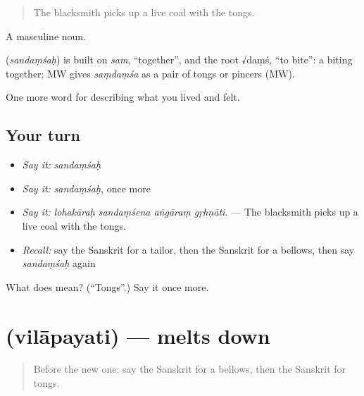 \begin{quote}
The blacksmith picks up a live coal with the tongs.
\end{quote}

A masculine noun.

\begin{cousinweb}
\textbf{} (\emph{sandaṃśaḥ}) is built on \emph{sam}, \textquotedblleft{}together\textquotedblright{}, and the root √daṃś, \textquotedblleft{}to bite\textquotedblright{}: a biting together; MW gives \emph{saṃdaṃśa} as a pair of tongs or pincers (MW).
\end{cousinweb}

\begin{grammarlens}[title={What you've built}]
One more word for describing what you lived and felt.
\end{grammarlens}

\subsection*{Your turn}
\begin{itemize}
\raggedright
  \item \emph{Say it:} \emph{sandaṃśaḥ}
  \item \emph{Say it:} \emph{sandaṃśaḥ}, once more
  \item \emph{Say it:} \emph{lohakāraḥ sandaṃśena aṅgāraṃ gṛhṇāti.} — The blacksmith picks up a live coal with the tongs.
  \item \emph{Recall:} say the Sanskrit for a tailor, then the Sanskrit for a bellows, then say \emph{sandaṃśaḥ} again
\end{itemize}

\begin{tcolorbox}[breakable,colback=teal!4,colframe=teal!35!black,title={Before you move on}]
What does  mean? (\textquotedblleft{}Tongs\textquotedblright{}.) Say it once more.
\end{tcolorbox}
\section[\texorpdfstring{\sk{विलापयति} (vilāpayati)}{विलापयति (vilāpayati)}]{ (vilāpayati) — melts down}

\label{lesson:SA-C507-vilapayati}



\begin{quote}
Before the new one: say the Sanskrit for a bellows, then the Sanskrit for tongs.
\end{quote}

